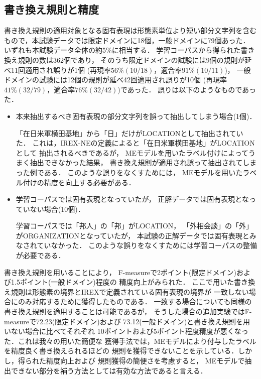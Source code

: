 \subsection{書き換え規則と精度}
\label{sec:trans_rules_and_accuracy}

書き換え規則の適用対象となる固有表現は形態素単位より短い部分文字列を含む
もので，本試験データでは限定ドメインに18個，一般ドメインに79個あった．
いずれも本試験データ全体の約5\%に相当する．
学習コーパスから得られた書き換え規則の数は362個であり，
そのうち限定ドメインの試験には9個の規則が延べ11回適用され誤りが1個
(再現率$56\%(10/18)$，適合率$91\%(10/11)$)，
一般ドメインの試験には12個の規則が延べ42回適用され誤りが10個
(再現率$41\%(32/79)$，適合率$76\%(32/42)$)であった．
誤りは以下のようなものであった．
\begin{itemize}
\item 本来抽出するべき固有表現の部分文字列を誤って抽出してしまう場合(1個)．

  「在日米軍横田基地」から「日」だけがLOCATIONとして抽出されていた．
  これは，IREX-NEの定義によると「在日米軍横田基地」がLOCATIONとして
  抽出されるべきであるが，  
  MEモデルを用いたラベル付けによってうまく抽出できなかった結果，
  書き換え規則が適用され誤って抽出されてしまった例である．
  このような誤りをなくすためには，
  MEモデルを用いたラベル付けの精度を向上する必要がある．
\item 学習コーパスでは固有表現となっていたが，
  正解データでは固有表現となっていない場合(10個)．

  学習コーパスでは「邦人」の「邦」がLOCATION，
  「外相会談」の「外」がORGANIZATIONとなっていたが，
  本試験の正解データでは固有表現とみなされていなかった．
  このような誤りをなくすためには学習コーパスの整備が必要である．
\end{itemize}

書き換え規則を用いることにより，
F-measureで2ポイント(限定ドメイン)および1.5ポイント(一般ドメイン)程度の
精度向上がみられた．
ここで用いた書き換え規則は形態素の境界とIREXで定義されている固有表現の境界が
一致しない場合にのみ対応するために獲得したものである．
一致する場合についても同様の書き換え規則を適用することは可能であるが，
そうした場合の追加実験ではF-measureで72.23(限定ドメイン)および
73.12(一般ドメイン)と書き換え規則を用いない場合に比べてそれぞれ
10ポイントおよび5ポイント程度精度が悪くなった．これは我々の用いた簡便な
獲得手法では，MEモデルにより付与したラベルを精度良く書き換えられるほどの
規則を獲得できないことを示している．しかし，得られた精度向上および
規則獲得の簡便さを考慮すると，
MEモデルで抽出できない部分を補う方法としては有効な方法であると言える．

